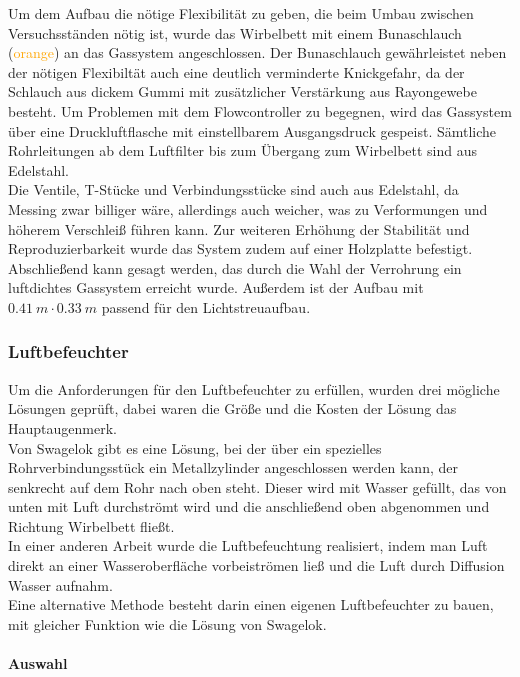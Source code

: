 Um dem Aufbau die nötige Flexibilität zu geben, die beim Umbau zwischen Versuchsständen nötig ist, wurde das Wirbelbett mit einem Bunaschlauch (\textcolor{orange}{orange}) an das Gassystem angeschlossen. Der Bunaschlauch gewährleistet neben der nötigen Flexibiltät auch eine deutlich verminderte Knickgefahr, da der Schlauch aus dickem Gummi mit zusätzlicher Verstärkung aus Rayongewebe besteht.
Um Problemen mit dem Flowcontroller zu begegnen, wird das Gassystem über eine Druckluftflasche mit einstellbarem Ausgangsdruck gespeist. Sämtliche Rohrleitungen ab dem Luftfilter bis zum Übergang zum Wirbelbett sind aus Edelstahl. \\
Die Ventile, T-Stücke und Verbindungsstücke sind auch aus Edelstahl, da Messing zwar billiger wäre, allerdings auch weicher, was zu Verformungen und höherem Verschleiß führen kann. Zur weiteren Erhöhung der Stabilität und Reproduzierbarkeit wurde das System zudem auf einer Holzplatte befestigt. \\
Abschließend kann gesagt werden, das durch die Wahl der Verrohrung ein luftdichtes Gassystem erreicht wurde. Außerdem ist der Aufbau mit $\SI{0,41}{m} \cdot \SI{0,33}{m}$ passend für den Lichtstreuaufbau.


\subsubsection{Luftbefeuchter}

Um die Anforderungen für den Luftbefeuchter zu erfüllen, wurden drei mögliche Lösungen geprüft, dabei waren die Größe und die Kosten der Lösung das Hauptaugenmerk. \\
Von Swagelok gibt es eine Lösung, bei der über ein spezielles Rohrverbindungsstück ein Metallzylinder angeschlossen werden kann, der senkrecht auf dem Rohr nach oben steht. Dieser wird mit Wasser gefüllt, das von unten mit Luft durchströmt wird und die anschließend oben abgenommen und Richtung Wirbelbett fließt. \\
In einer anderen Arbeit \cite{Fallturmexperiment} wurde die Luftbefeuchtung realisiert, indem man Luft direkt an einer  Wasseroberfläche vorbeiströmen ließ und die Luft durch Diffusion Wasser aufnahm. \\
Eine alternative Methode besteht darin einen eigenen Luftbefeuchter zu bauen, mit gleicher Funktion wie die Lösung von Swagelok. 


\paragraph{Auswahl}

